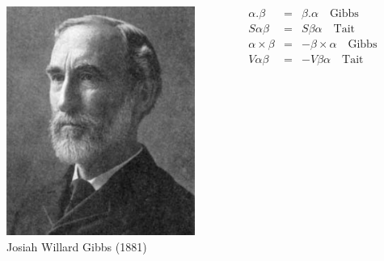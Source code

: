 \documentclass{beamer}
\begin{document}
\begin{frame}
\begin{columns}
    \end{columns}
\end{frame}

\begin{frame}
    \begin{columns}
        \begin{center}
            \begin{figure}
            \includegraphics[scale=0.4]{../gfx/gibbs}
                \caption{Josiah Willard Gibbs (1881)}
            \end{figure}
        \end{center}
       \begin{eqnarray*}
           \alpha . \beta &=& \beta . \alpha \quad \text{Gibbs} \\
           S\alpha\beta &=& S\beta\alpha \quad \text{Tait} \\
           \alpha \times \beta &=& -\beta \times \alpha \quad \text{Gibbs} \\  
           V\alpha\beta &=& -V\beta\alpha \quad \text{Tait} \\  
       \end{eqnarray*}
    \end{columns}
\end{frame}
\end{document}
